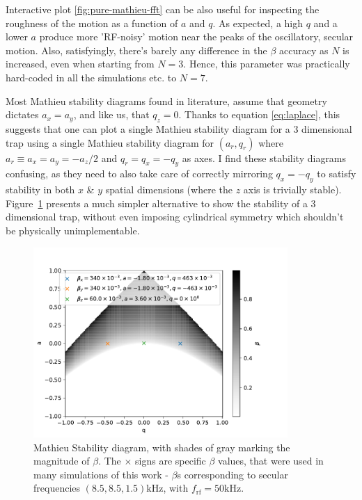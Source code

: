 Interactive plot \ref{fig:pure-mathieu-fft} can be also useful for inspecting the roughness of the motion as a function of $a$ and $q$. As expected, a high $q$ and a lower $a$ produce more 'RF-noisy' motion near the peaks of the oscillatory, secular motion. Also, satisfyingly, there's barely any difference in the $\beta$ accuracy as $N$ is increased, even when starting from $N=3$. Hence, this parameter was practically hard-coded in all the simulations etc. to $N=7$.

Most Mathieu stability diagrams found in literature, assume that geometry dictates $a_x = a_y$, and like us, that $q_z = 0$. Thanks to equation \ref{eq:laplace}, this suggests that one can plot a single Mathieu stability diagram for a 3 dimensional trap using a single Mathieu stability diagram for $(a_r,q_r)$ where $a_r \equiv a_x = a_y = -a_z/2$ and $q_r = q_x = -q_y$ as axes. I find these stability diagrams confusing, as they need to also take care of correctly mirroring $q_x = -q_y$ to satisfy stability in both $x$ \& $y$ spatial dimensions (where the $z$ axis is trivially stable). Figure~\ref{fig:mathieu-stability} presents a much simpler alternative to show the stability of a 3 dimensional trap, without even imposing cylindrical symmetry which shouldn't be physically unimplementable.

\begin{figure}
	\begin{center}
		\includegraphics[width=0.86\textwidth]{graphics/pure-mathieu-stability.pdf}
	\end{center}
	\caption{Mathieu Stability diagram, with shades of gray marking the magnitude of $\beta$. The $\times$ signs are specific $\beta$ values, that were used in many simulations of this work - $\beta$s corresponding to secular frequencies $(8.5, 8.5, 1.5)\mathrm{kHz}$, with $f_\mathrm{rf} = 50\mathrm{kHz}$.}
	\label{fig:mathieu-stability}
\end{figure}

